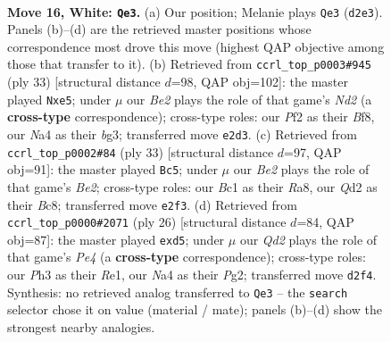 \documentclass[11pt]{article}
\begin{document}
\clearpage

\begin{figure}[p]\centering
\begin{subfigure}{0.46\textwidth}\centering
\resizebox{\linewidth}{!}{%
\newchessgame
\chessboard[
  setfen={r1br2k1/ppp2p1p/3p2p1/4b3/N1P1Pn1q/7P/PP1QBPP1/R1B2R1K w - - 11 16},
  showmover=false,
  pgfstyle=straightmove, color=movearrow, markmove={d2-e3}
]}
\caption{}
\end{subfigure}\hfill
\begin{subfigure}{0.46\textwidth}\centering
\resizebox{\linewidth}{!}{%
\newchessgame
\chessboard[
  setfen={r3kbr1/p2n1p2/b1p1p2p/q3N1p1/1ppP4/6B1/PPQ1BPPP/R4RK1 b q - 5 17},
  showmover=false,
  pgfstyle=straightmove, color=movearrow, markmove={d7-e5}
]}
\caption{}
\end{subfigure}
\\[4pt]
\begin{subfigure}{0.46\textwidth}\centering
\resizebox{\linewidth}{!}{%
\newchessgame
\chessboard[
  setfen={r1b1r1k1/1pq1bppp/5n2/4pN2/p7/2P2QB1/PPB2PPP/R4RK1 b - - 3 17},
  showmover=false,
  pgfstyle=straightmove, color=movearrow, markmove={e7-c5}
]}
\caption{}
\end{subfigure}\hfill
\begin{subfigure}{0.46\textwidth}\centering
\resizebox{\linewidth}{!}{%
\newchessgame
\chessboard[
  setfen={2r1kb1r/1b1p1ppp/p3p3/qp1n4/3QPP2/3BB3/PPP3PP/1K1RR3 w k - 0 14},
  showmover=false,
  pgfstyle=straightmove, color=movearrow, markmove={e4-d5}
]}
\caption{}
\end{subfigure}
\caption{\textbf{Move 16, White: \texttt{Qe3}.} (a) Our position; Melanie plays \texttt{Qe3} (\texttt{d2e3}). Panels (b)--(d) are the retrieved master positions whose correspondence most drove this move (highest QAP objective among those that transfer to it). (b) Retrieved from \texttt{ccrl\_top\_p0003\#945} (ply 33) [structural distance $d$=98, QAP obj=102]: the master played \texttt{Nxe5}; under $\mu$ our \emph{Be2} plays the role of that game's \emph{Nd2} (a \textbf{cross-type} correspondence); cross-type roles: our \emph{P}f2 as their \emph{B}f8, our \emph{N}a4 as their \emph{b}g3; transferred move \texttt{e2d3}. (c) Retrieved from \texttt{ccrl\_top\_p0002\#84} (ply 33) [structural distance $d$=97, QAP obj=91]: the master played \texttt{Bc5}; under $\mu$ our \emph{Be2} plays the role of that game's \emph{Be2}; cross-type roles: our \emph{B}c1 as their \emph{R}a8, our \emph{Q}d2 as their \emph{B}c8; transferred move \texttt{e2f3}. (d) Retrieved from \texttt{ccrl\_top\_p0000\#2071} (ply 26) [structural distance $d$=84, QAP obj=87]: the master played \texttt{exd5}; under $\mu$ our \emph{Qd2} plays the role of that game's \emph{Pe4} (a \textbf{cross-type} correspondence); cross-type roles: our \emph{P}h3 as their \emph{R}e1, our \emph{N}a4 as their \emph{P}g2; transferred move \texttt{d2f4}. Synthesis: no retrieved analog transferred to \texttt{Qe3} -- the \texttt{search} selector chose it on value (material / mate); panels (b)--(d) show the strongest nearby analogies.}
\label{fig:thought-m30}
\end{figure}
\end{document}
